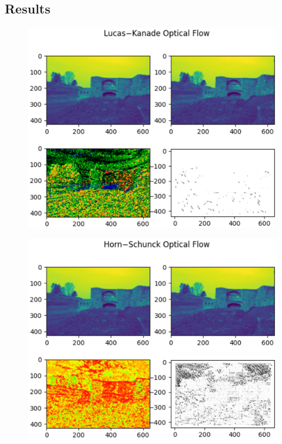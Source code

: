 \documentclass[9pt]{IEEEtran}
\begin{document}
\subsection{Results}
\begin{figure}[h]
    \centering
    \includegraphics[width=1\columnwidth]{collisionlk.eps}
    \label{fig:disparitylk}
\end{figure}
\begin{figure}[h]
    \centering
    \includegraphics[width=1\columnwidth]{collisionhs.eps}
    \label{fig:disparityhs}
\end{figure}
\end{document}
